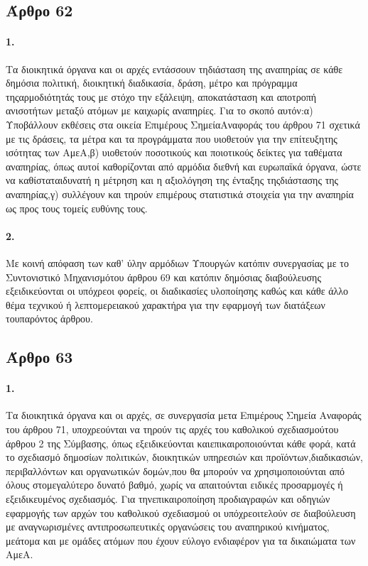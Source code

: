 \documentclass[a4paper,oneside, 10pt]{book}
\begin{document}
\subsection*{ Άρθρο 62 }
\paragraph { 1. } Τα διοικητικά όργανα και οι αρχές εντάσσουν τηδιάσταση της αναπηρίας σε κάθε δημόσια πολιτική, διοικητική διαδικασία, δράση, μέτρο και πρόγραμμα τηςαρμοδιότητάς τους με στόχο την εξάλειψη, αποκατάσταση και αποτροπή ανισοτήτων μεταξύ ατόμων με καιχωρίς αναπηρίες. Για το σκοπό αυτόν:α) Υποβάλλουν εκθέσεις στα οικεία Επιμέρους ΣημείαΑναφοράς του άρθρου 71 σχετικά με τις δράσεις, τα μέτρα και τα προγράμματα που υιοθετούν για την επίτευξητης ισότητας των ΑμεΑ,β) υιοθετούν ποσοτικούς και ποιοτικούς δείκτες για ταθέματα αναπηρίας, όπως αυτοί καθορίζονται από αρμόδια διεθνή και ευρωπαϊκά όργανα, ώστε να καθίσταταιδυνατή η μέτρηση και η αξιολόγηση της ένταξης τηςδιάστασης της αναπηρίας,γ) συλλέγουν και τηρούν επιμέρους στατιστικά στοιχεία για την αναπηρία ως προς τους τομείς ευθύνης τους.
\paragraph { 2. } Με κοινή απόφαση των καθ’ ύλην αρμόδιων Υπουργών κατόπιν συνεργασίας με το Συντονιστικό Μηχανισμότου άρθρου 69 και κατόπιν δημόσιας διαβούλευσης εξειδικεύονται οι υπόχρεοι φορείς, οι διαδικασίες υλοποίησης καθώς και κάθε άλλο θέμα τεχνικού ή λεπτομερειακού χαρακτήρα για την εφαρμογή των διατάξεων τουπαρόντος άρθρου.
\subsection*{ Άρθρο 63 }
\paragraph { 1. } Τα διοικητικά όργανα και οι αρχές, σε συνεργασία μετα Επιμέρους Σημεία Αναφοράς του άρθρου 71, υποχρεούνται να τηρούν τις αρχές του καθολικού σχεδιασμούτου άρθρου 2 της Σύμβασης, όπως εξειδικεύονται καιεπικαιροποιούνται κάθε φορά, κατά το σχεδιασμό δημοσίων πολιτικών, διοικητικών υπηρεσιών και προϊόντων,διαδικασιών, περιβαλλόντων και οργανωτικών δομών,που θα μπορούν να χρησιμοποιούνται από όλους στομεγαλύτερο δυνατό βαθμό, χωρίς να απαιτούνται ειδικές προσαρμογές ή εξειδικευμένος σχεδιασμός. Για τηνεπικαιροποίηση προδιαγραφών και οδηγιών εφαρμογής των αρχών του καθολικού σχεδιασμού οι υπόχρεοιτελούν σε διαβούλευση με αναγνωρισμένες αντιπροσωπευτικές οργανώσεις του αναπηρικού κινήματος, μεάτομα και με ομάδες ατόμων που έχουν εύλογο ενδιαφέρον για τα δικαιώματα των ΑμεΑ.
\end{document}
